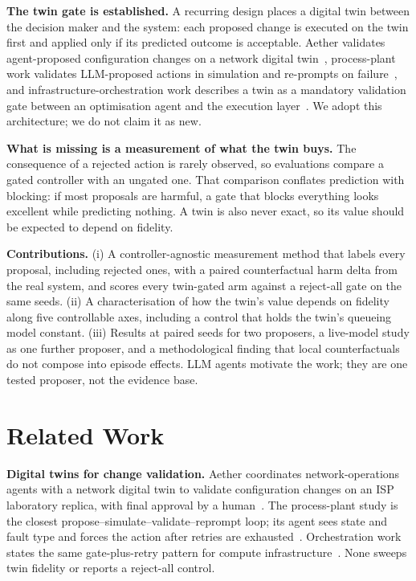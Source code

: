 \documentclass[conference]{IEEEtran}
\begin{document}
\textbf{The twin gate is established.} A recurring design places a digital twin between the decision maker and the system: each proposed change is executed on the twin first and applied only if its predicted outcome is acceptable. Aether validates agent-proposed configuration changes on a network digital twin~\cite{aether}, process-plant work validates LLM-proposed actions in simulation and re-prompts on failure~\cite{processplant}, and infrastructure-orchestration work describes a twin as a mandatory validation gate between an optimisation agent and the execution layer~\cite{twingatedorch}. We adopt this architecture; we do not claim it as new.

\textbf{What is missing is a measurement of what the twin buys.} The consequence of a rejected action is rarely observed, so evaluations compare a gated controller with an ungated one. That comparison conflates prediction with blocking: if most proposals are harmful, a gate that blocks everything looks excellent while predicting nothing. A twin is also never exact, so its value should be expected to depend on fidelity.

\textbf{Contributions.} (i) A controller-agnostic measurement method that labels every proposal, including rejected ones, with a paired counterfactual harm delta from the real system, and scores every twin-gated arm against a reject-all gate on the same seeds. (ii) A characterisation of how the twin's value depends on fidelity along five controllable axes, including a control that holds the twin's queueing model constant. (iii) Results at \NSeeds{} paired seeds for two proposers, a live-model study as one further proposer, and a methodological finding that local counterfactuals do not compose into episode effects. LLM agents motivate the work; they are one tested proposer, not the evidence base.

\section{Related Work}
\textbf{Digital twins for change validation.} Aether coordinates network-operations agents with a network digital twin to validate configuration changes on an ISP laboratory replica, with final approval by a human~\cite{aether}. The process-plant study is the closest propose--simulate--validate--reprompt loop; its agent sees state and fault type and forces the action after retries are exhausted~\cite{processplant}. Orchestration work states the same gate-plus-retry pattern for compute infrastructure~\cite{twingatedorch}. None sweeps twin fidelity or reports a reject-all control.
\end{document}
